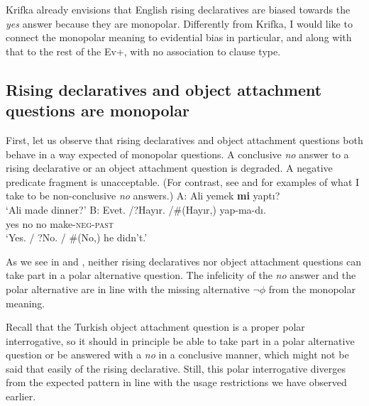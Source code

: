 \documentclass[output=paper,colorlinks,citecolor=brown]{langscibook}
\begin{document}
Krifka already envisions that English rising declaratives are biased towards the \textit{yes} answer because they are monopolar. Differently from Krifka, I would like to connect the monopolar meaning to evidential bias in particular, and along with that to the rest of the Ev+, with no association to clause type.

\subsection{Rising declaratives and object attachment questions are monopolar}\label{sec:11:3:1}

First, let us observe that rising declaratives and object attachment questions both behave in a way expected of monopolar questions. A conclusive \textit{no} answer to a rising declarative or an object attachment question is degraded.  A negative predicate fragment is unacceptable. (For contrast, see  and  for examples of what I take to be non-conclusive \textit{no} answers.)
\ea \label{oa-answer}
A: Ali yemek  \textbf{mi} yaptı?\\
\glt \phantom{A:} `Ali made dinner?'
\sn B:
\gll Evet. /?Hayır. /\#(Hayır,) yap-ma-dı.\\
 yes \phantom{/?}no \phantom{/\#(}no make-\textsc{neg-past} \\
\glt \phantom{B:} `Yes. / ?No. / \#(No,) he didn't.'
\z

As we see in  and , neither rising declaratives nor object attachment questions can take part in a polar alternative question. The infelicity of the \textit{no} answer and the polar alternative are in line with the missing alternative $\neg\phi$ from the monopolar meaning. 
\label{polalt-oa}
\z

Recall that the Turkish object attachment question is a proper polar interrogative, so it should in principle be able to take part in a polar alternative question or be answered with a \textit{no} in a conclusive manner, which might not be said that easily of the rising declarative. Still, this polar interrogative diverges from the expected pattern in line with the usage restrictions we have observed earlier.
\end{document}
